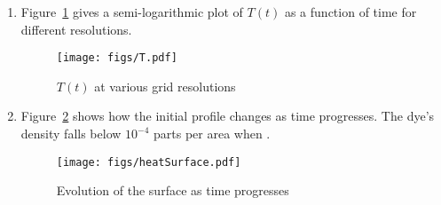 \documentclass[12pt,a4]{article}
\begin{document}
\begin{enumerate}
\begin{enumerate}
      \item
        Figure~\ref{fig:T} gives a semi-logarithmic plot of $T(t)$ as a function of time for different resolutions.
        \begin{figure}[H]
          \centering
          \texttt{[image: figs/T.pdf]}
          \caption{$T(t)$ at various grid resolutions}
          \label{fig:T}
        \end{figure}
      \item
        Figure~\ref{fig:heatSurface} shows how the initial profile changes as time progresses.
        The dye's density falls below $10^{-4}$ parts per area when .

        \begin{figure}[H]
          \centering
          \texttt{[image: figs/heatSurface.pdf]}
          \caption{Evolution of the surface as time progresses}
          \label{fig:heatSurface}
        \end{figure}
    \end{enumerate}


\end{enumerate}
\end{document}
